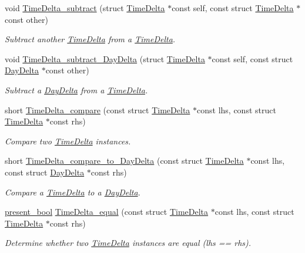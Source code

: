 \begin{DoxyCompactItemize}
void \hyperlink{time-delta_8h_aabc9864d36d4b617bccd6af5baba8fa2}{Time\-Delta\-\_\-subtract} (struct \hyperlink{structTimeDelta}{Time\-Delta} $\ast$const self, const struct \hyperlink{structTimeDelta}{Time\-Delta} $\ast$const other)
\begin{DoxyCompactList}\small\item\em Subtract another \hyperlink{structTimeDelta}{Time\-Delta} from a \hyperlink{structTimeDelta}{Time\-Delta}. \end{DoxyCompactList}\item 
void \hyperlink{time-delta_8h_a4c1cce3fe60da8412454e06e9b4a8a1d}{Time\-Delta\-\_\-subtract\-\_\-\-Day\-Delta} (struct \hyperlink{structTimeDelta}{Time\-Delta} $\ast$const self, const struct \hyperlink{structDayDelta}{Day\-Delta} $\ast$const other)
\begin{DoxyCompactList}\small\item\em Subtract a \hyperlink{structDayDelta}{Day\-Delta} from a \hyperlink{structTimeDelta}{Time\-Delta}. \end{DoxyCompactList}\item 
short \hyperlink{time-delta_8h_a71d75e4cc41329092abf2aefb62914ee}{Time\-Delta\-\_\-compare} (const struct \hyperlink{structTimeDelta}{Time\-Delta} $\ast$const lhs, const struct \hyperlink{structTimeDelta}{Time\-Delta} $\ast$const rhs)
\begin{DoxyCompactList}\small\item\em Compare two \hyperlink{structTimeDelta}{Time\-Delta} instances. \end{DoxyCompactList}\item 
short \hyperlink{time-delta_8h_a054bd6ac2c66a664b0da4c4bb8f9f73b}{Time\-Delta\-\_\-compare\-\_\-to\-\_\-\-Day\-Delta} (const struct \hyperlink{structTimeDelta}{Time\-Delta} $\ast$const lhs, const struct \hyperlink{structDayDelta}{Day\-Delta} $\ast$const rhs)
\begin{DoxyCompactList}\small\item\em Compare a \hyperlink{structTimeDelta}{Time\-Delta} to a \hyperlink{structDayDelta}{Day\-Delta}. \end{DoxyCompactList}\item 
\hyperlink{types_8h_a1c24e2cdd988b886e889080ded176ae0}{present\-\_\-bool} \hyperlink{time-delta_8h_a99614ad03a84af18cd60d8b25d5c4cee}{Time\-Delta\-\_\-equal} (const struct \hyperlink{structTimeDelta}{Time\-Delta} $\ast$const lhs, const struct \hyperlink{structTimeDelta}{Time\-Delta} $\ast$const rhs)
\begin{DoxyCompactList}\small\item\em Determine whether two \hyperlink{structTimeDelta}{Time\-Delta} instances are equal (lhs == rhs). \end{DoxyCompactList}\item 

\end{DoxyCompactItemize}
